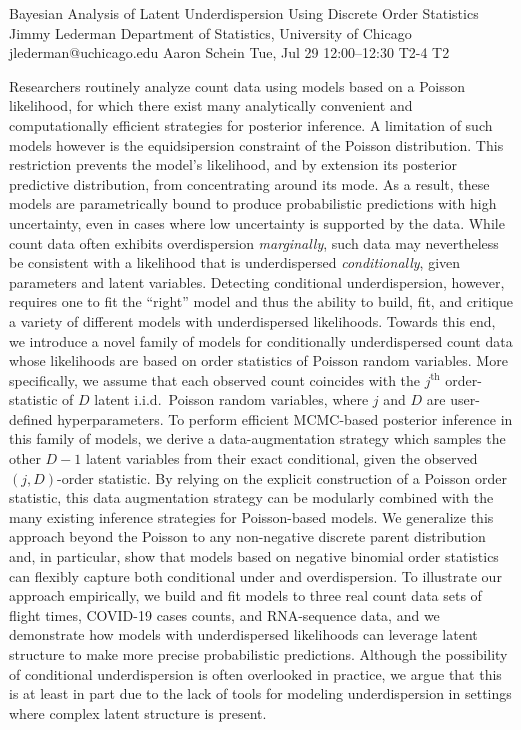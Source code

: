 \begin{talk}
  {Bayesian Analysis of Latent Underdispersion Using Discrete Order Statistics}%
  {Jimmy Lederman}%
  {Department of Statistics, University of Chicago}%
  {jlederman@uchicago.edu}%
  {Aaron Schein}%
  {}%
  {Tue, Jul 29 12:00–12:30}%
  {T2-4}%
  {T2}%
  
				


Researchers routinely analyze count data using models based on a Poisson likelihood, for which there exist many analytically convenient and computationally efficient strategies for posterior inference. A limitation of such models however is the equidsipersion constraint of the Poisson distribution. This restriction prevents the model's likelihood, and by extension its posterior predictive distribution, from concentrating around its mode. As a result, these models are parametrically bound to produce probabilistic predictions with high uncertainty, even in cases where low uncertainty is supported by the data. While count data often exhibits overdispersion \textit{marginally}, such data may nevertheless be consistent with a likelihood that is underdispersed \textit{conditionally}, given parameters and latent variables. Detecting conditional underdispersion, however, requires one to fit the ``right'' model and thus the ability to build, fit, and critique a variety of different models with underdispersed likelihoods. Towards this end, we introduce a novel family of models for conditionally underdispersed count data whose likelihoods are based on order statistics of Poisson random variables. More specifically, we assume that each observed count coincides with the $j^{\textrm{th}}$ order-statistic of $D$ latent i.i.d.~Poisson random variables, where $j$ and $D$ are user-defined hyperparameters. To perform efficient MCMC-based posterior inference in this family of models, we derive a data-augmentation strategy which samples the other $D{-}1$ latent variables from their exact conditional, given the observed $(j,D)$-order statistic. By relying on the explicit construction of a Poisson order statistic, this data augmentation strategy can be modularly combined with the many existing inference strategies for Poisson-based models. We generalize this approach beyond the Poisson to any non-negative discrete parent distribution and, in particular, show that models based on negative binomial order statistics can flexibly capture both conditional under and overdispersion.  To illustrate our approach empirically, we build and fit models to three real count data sets of flight times, COVID-19 cases counts, and RNA-sequence data, and we demonstrate how models with underdispersed likelihoods can leverage latent structure to make more precise probabilistic predictions. Although the possibility of conditional underdispersion is often overlooked in practice, we argue that this is at least in part due to the lack of tools for modeling underdispersion in settings where complex latent structure is present.


\end{talk}
